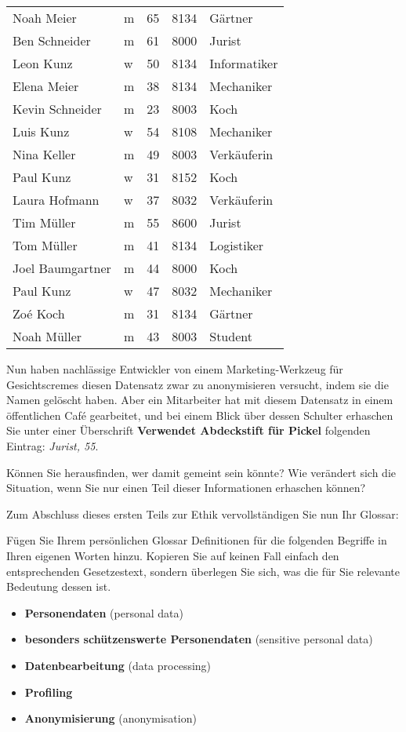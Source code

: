 \begin{lpu}
\begin{longtable}{llrrl}
Noah Meier & m & 65 & 8134 & Gärtner \\
Ben Schneider & m & 61 & 8000 & Jurist \\
Leon Kunz & w & 50 & 8134 & Informatiker \\
Elena Meier & m & 38 & 8134 & Mechaniker \\
Kevin Schneider & m & 23 & 8003 & Koch \\
Luis Kunz & w & 54 & 8108 & Mechaniker \\
Nina Keller & m & 49 & 8003 & Verkäuferin \\
Paul Kunz & w & 31 & 8152 & Koch \\
Laura Hofmann & w & 37 & 8032 & Verkäuferin \\
Tim Müller & m & 55 & 8600 & Jurist \\
Tom Müller & m & 41 & 8134 & Logistiker \\
Joel Baumgartner & m & 44 & 8000 & Koch \\
Paul Kunz & w & 47 & 8032 & Mechaniker \\
Zoé Koch & m & 31 & 8134 & Gärtner \\
Noah Müller & m & 43 & 8003 & Student \\
\end{longtable}

\begin{aufgabe}{4}
    Nun haben nachlässige Entwickler von einem Marketing-Werkzeug für Gesichtscremes diesen Datensatz zwar zu anonymisieren versucht, indem sie die Namen gelöscht haben. Aber ein Mitarbeiter hat mit diesem Datensatz in einem öffentlichen Café gearbeitet, und bei einem Blick über dessen Schulter erhaschen Sie unter einer Überschrift \textbf{Verwendet Abdeckstift für Pickel} folgenden Eintrag: \textit{Jurist, 55}.

    Können Sie herausfinden, wer damit gemeint sein könnte? Wie verändert sich die Situation, wenn Sie nur einen Teil dieser Informationen erhaschen können?
\end{aufgabe}

Zum Abschluss dieses ersten Teils zur Ethik vervollständigen Sie nun Ihr Glossar:

\begin{aufgabe}{5}
Fügen Sie Ihrem persönlichen Glossar Definitionen für die folgenden Begriffe in Ihren eigenen Worten hinzu. Kopieren Sie auf keinen Fall einfach den entsprechenden Gesetzestext, sondern überlegen Sie sich, was die für Sie relevante Bedeutung dessen ist.

\vspace{0.5em}
\begin{itemize}
  \item \textbf{Personendaten} (personal data)
  \item \textbf{besonders schützenswerte Personendaten} (sensitive personal data)
  \item \textbf{Datenbearbeitung} (data processing)
  \item \textbf{Profiling}
  \item \textbf{Anonymisierung} (anonymisation)
\end{itemize}


\end{aufgabe}
\end{lpu}
